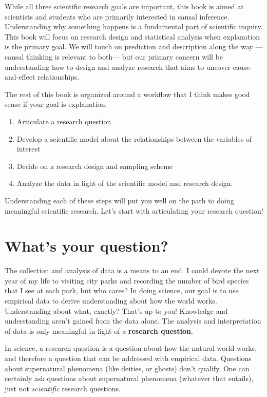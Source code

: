 \documentclass[
]{book}
\providecommand{\tightlist}{%
  \setlength{\itemsep}{0pt}\setlength{\parskip}{0pt}}
\begin{document}
While all three scientific research goals are important, this book is aimed at scientists and students who are primarily interested in causal inference. Understanding why something happens is a fundamental part of scientific inquiry. This book will focus on research design and statistical analysis when explanation is the primary goal. We will touch on prediction and description along the way ---causal thinking is relevant to both--- but our primary concern will be understanding how to design and analyze research that aims to uncover cause-and-effect relationships.

The rest of this book is organized around a workflow that I think makes good sense if your goal is explanation:

\begin{enumerate}
\def\labelenumi{\arabic{enumi}.}
\tightlist
\item
  Articulate a research question
\item
  Develop a scientific model about the relationships between the variables of interest
\item
  Decide on a research design and sampling scheme
\item
  Analyze the data in light of the scientific model and research design.
\end{enumerate}

Understanding each of these steps will put you well on the path to doing meaningful scientific research. Let's start with articulating your research question!

\chapter{What's your question?}\label{whats-your-question}

The collection and analysis of data is a means to an end. I could devote the next year of my life to visiting city parks and recording the number of bird species that I see at each park, but who cares? In doing science, our goal is to use empirical data to derive understanding about how the world works. Understanding about what, exactly? That's up to you! Knowledge and understanding aren't gained from the data alone. The analysis and interpretation of data is only meaningful in light of a \textbf{research question}.

In science, a research question is a question about how the natural world works, and therefore a question that can be addressed with empirical data. Questions about supernatural phenomena (like deities, or ghosts) don't qualify. One can certainly ask questions about supernatural phenomena (whatever that entails), just not \emph{scientific} research questions.
\end{document}

